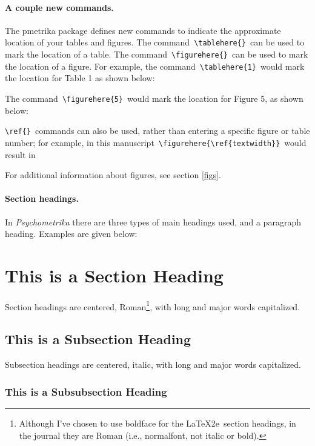 \documentclass[titlepage,12pt]{article}
\begin{document}
\paragraph{A couple new commands.} The pmetrika package defines new commands to indicate the
approximate location of your tables and figures. The
command~\verb=\tablehere{}=~can be used to mark the location of a
table. The command~\verb=\figurehere{}=~can be used to mark the
location of a figure. For example, the
command~\verb=\tablehere{1}=~would mark the location for Table 1
as shown below:


\noindent The command~\verb=\figurehere{5}=~would mark the
location for Figure 5, as shown below:


\noindent \verb=\ref{}=~commands can also be used, rather than
entering a specific figure or table number; for example, in this
manuscript~\verb=\figurehere{\ref{textwidth}}=~would result in

\figurehere{\ref{textwidth}}

For additional information about figures, see section \ref{figs}.

\paragraph{Section headings.} In \textit{Psychometrika} there are three types of main headings used, and a
paragraph heading. Examples are given below:

\section*{This is a Section Heading}

Section headings are centered, Roman\footnote{Although I've chosen
to use boldface for the \LaTeX2e\ section headings, in the journal
they are Roman (i.e., normalfont, not italic or bold).}, with long
and major words capitalized.

\subsection*{This is a Subsection Heading}

Subsection headings are centered, italic, with long and major
words capitalized.

\subsubsection*{This is a Subsubsection Heading}
\end{document}
